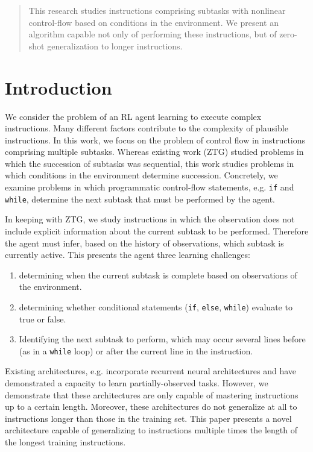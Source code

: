 \documentclass{article}
\begin{document}

\begin{abstract}
  This research studies instructions comprising subtasks with nonlinear control-flow based on conditions in
  the environment. We present an algorithm capable not only of performing these
  instructions, but of zero-shot generalization to longer instructions.
\end{abstract}

\section{Introduction}
 We consider the problem of an RL agent learning to execute complex instructions.
 Many different factors contribute to the
complexity of plausible instructions. In this work, we focus on the problem of
control flow in instructions comprising multiple subtasks. Whereas existing work
\cite{oh2017zero} (ZTG) studied problems in which the succession of subtasks was
sequential, this work studies problems in which conditions in the environment
determine succession. Concretely, we examine problems in which programmatic
control-flow statements, e.g. \texttt{if} and \texttt{while}, determine the next subtask
that must be performed by the agent. 

In keeping with ZTG, we study instructions in which the observation does
not include explicit information about the current subtask to be performed.
Therefore the agent must infer, based on the history of observations, which
subtask is currently active. This presents the agent three learning challenges:
\begin{enumerate}
  \item determining when the current subtask is complete based on observations of
    the environment.
  \item determining whether conditional statements (\texttt{if}, \texttt{else},
    \texttt{while}) evaluate to true or false.
  \item Identifying the next subtask to perform, which may occur several lines before (as in a
    \texttt{while} loop) or after the current line in the instruction.
\end{enumerate}

Existing architectures, e.g. \cite{heess2015memory} incorporate recurrent neural
architectures and have demonstrated a capacity to learn partially-observed
tasks. However, we demonstrate that these architectures are only capable of
mastering instructions up to a certain length. Moreover, these architectures do not
generalize at all to instructions longer than those in the training set. This paper presents a novel architecture capable of generalizing
to instructions multiple times the length of the longest training instructions.
\end{document}
